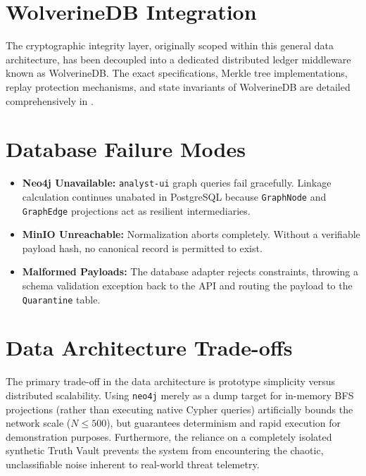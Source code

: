 \section{WolverineDB Integration}
\label{sec:data-wolverinedb}
The cryptographic integrity layer, originally scoped within this general data architecture, has been decoupled into a dedicated distributed ledger middleware known as WolverineDB. The exact specifications, Merkle tree implementations, replay protection mechanisms, and state invariants of WolverineDB are detailed comprehensively in .

\section{Database Failure Modes}
\label{sec:data-failures}
\begin{itemize}
    \item \textbf{Neo4j Unavailable:} \texttt{analyst-ui} graph queries fail gracefully. Linkage calculation continues unabated in PostgreSQL because \texttt{GraphNode} and \texttt{GraphEdge} projections act as resilient intermediaries.
    \item \textbf{MinIO Unreachable:} Normalization aborts completely. Without a verifiable payload hash, no canonical record is permitted to exist.
    \item \textbf{Malformed Payloads:} The database adapter rejects constraints, throwing a schema validation exception back to the API and routing the payload to the \texttt{Quarantine} table.
\end{itemize}

\section{Data Architecture Trade-offs}
\label{sec:data-tradeoffs}
The primary trade-off in the data architecture is prototype simplicity versus distributed scalability. Using \texttt{neo4j} merely as a dump target for in-memory BFS projections (rather than executing native Cypher queries) artificially bounds the network scale ($N \le 500$), but guarantees determinism and rapid execution for demonstration purposes. Furthermore, the reliance on a completely isolated synthetic Truth Vault prevents the system from encountering the chaotic, unclassifiable noise inherent to real-world threat telemetry.

